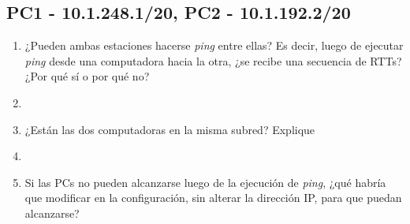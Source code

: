 \subsection*{PC1 - 10.1.248.1/20, PC2 - 10.1.192.2/20}
\begin{enumerate}
  \item ¿Pueden ambas estaciones hacerse \textit{ping} entre ellas? Es decir, luego de ejecutar \textit{ping} desde una computadora
  hacia la otra, ¿se recibe una secuencia de RTTs?¿Por qu\'e s\'i o por qu\'e no?
  \item[]

  \item ¿Est\'an las dos computadoras en la misma subred? Explique
  \item[]

  \item Si las PCs no pueden alcanzarse luego de la ejecuci\'on de \textit{ping}, ¿qu\'e habr\'ia que modificar en la configuraci\'on,
  sin alterar la direcci\'on IP, para que puedan alcanzarse?
\end{enumerate}